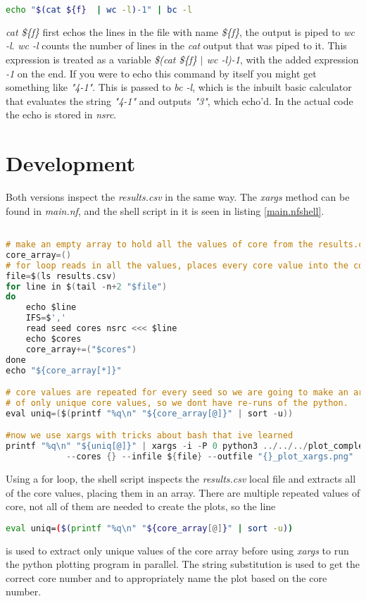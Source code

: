 \documentclass{article}
\begin{document}
\begin{lstlisting}[language=bash]
   	echo "$(cat ${f}  | wc -l)-1" | bc -l
\end{lstlisting}
     \textit{cat \$\{f\}} first echos the lines in the file with name \textit{\$\{f\}}, the output is piped to \textit{wc -l}. \textit{wc -l} counts the number of lines in the \textit{cat} output that was piped to it. This expression is treated as a variable \textit{\$(cat \$\{f\}  $|$ wc -l)-1}, with the added expression \textit{-1} on the end.
     If you were to echo this command by itself you might get something like \textit{"4-1"}. This is passed to \textit{bc -l}, which is the inbuilt basic calculator that evaluates the string \textit{"4-1"} and outputs \textit{"3"}, which echo'd. In the actual code the echo is stored in \textit{nsrc}. 

    
    \section{Development}
    \label{development}
    Both versions inspect the \textit{results.csv} in the same way.
    The \textit{xargs} method can be found in \textit{main.nf}, and the shell script in it is seen in listing \ref{main.nfshell}. 
\begin{lstlisting}[language=C, label=main.nfshell]

# make an empty array to hold all the values of core from the results.csv
core_array=()
# for loop reads in all the values, places every core value into the core_array
file=$(ls results.csv)
for line in $(tail -n+2 "$file")
do
	echo $line
	IFS=$','
	read seed cores nsrc <<< $line
	echo $cores
	core_array+=("$cores")
done
echo "${core_array[*]}"

# core values are repeated for every seed so we are going to make an array 
# of only unique core values, so we dont have re-runs of the python. 
eval uniq=($(printf "%q\n" "${core_array[@]}" | sort -u))

#now we use xargs with tricks about bash that ive learned
printf "%q\n" "${uniq[@]}" | xargs -i -P 0 python3 ../../../plot_completeness.py 
			--cores {} --infile ${file} --outfile "{}_plot_xargs.png"


\end{lstlisting}

	Using a for loop, the shell script inspects the \textit{results.csv} local file and extracts all of the core values, placing them in an array.
	There are multiple repeated values of core, not all of them are needed to create the plots, so the line
	\begin{lstlisting}[language=bash]
	eval uniq=($(printf "%q\n" "${core_array[@]}" | sort -u))
	\end{lstlisting}
    is used to extract only unique values of the core array before using \textit{xargs} to run the python plotting program in parallel.
    The string substitution is used to get the correct core number and to appropriately name the plot based on the core number.
    
\end{document}
